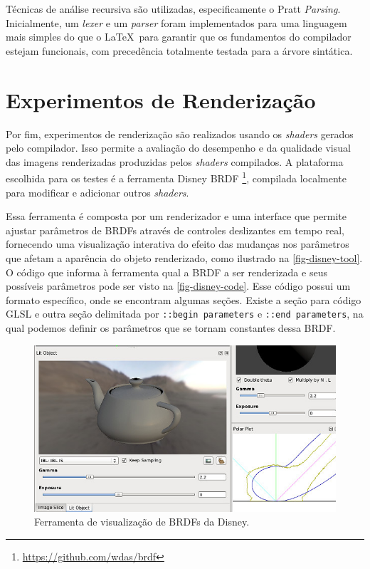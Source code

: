 \documentclass[english, 
               brazil, 
               bsc] %
               {dcomp-abntex2}
\begin{document}
Técnicas de análise recursiva são utilizadas, especificamente o Pratt \textit{Parsing}. Inicialmente, um \textit{lexer} e um \textit{parser} foram implementados para uma linguagem mais simples do que o \LaTeX\  para garantir que os fundamentos do compilador estejam funcionais, com precedência totalmente testada para a árvore sintática.




\section{Experimentos de Renderização} \label{experimentos-renderizacao}


Por fim, experimentos de renderização são realizados usando os \textit{shaders} gerados pelo compilador. Isso permite a avaliação do desempenho e da qualidade visual das imagens renderizadas produzidas pelos \textit{shaders} compilados. A plataforma escolhida para os testes é a ferramenta Disney BRDF \footnote{\url{https://github.com/wdas/brdf}}, compilada localmente para modificar e adicionar outros \textit{shaders}.


Essa ferramenta é composta por um renderizador e uma interface que permite ajustar parâmetros de BRDFs através de controles deslizantes em tempo real, fornecendo uma visualização interativa do efeito das mudanças nos parâmetros que afetam a aparência do objeto renderizado, como ilustrado na \autoref{fig-disney-tool}. O código que informa à ferramenta qual a BRDF a ser renderizada e seus possíveis parâmetros pode ser visto na \autoref{fig-disney-code}. Esse código possui um formato específico, onde se encontram algumas seções. Existe a seção para código GLSL e outra seção delimitada por \texttt{::begin parameters} e \texttt{::end parameters}, na qual podemos definir os parâmetros que se tornam constantes dessa BRDF.




\begin{figure}[htb]
        \caption{\label{fig-disney-tool} \small Ferramenta de visualização de BRDFs da Disney.}
        \begin{center}
            \includegraphics[scale=0.7]{./Imagens/disney-brdf-tool.png}
        \end{center}
\end{figure}
\end{document}
